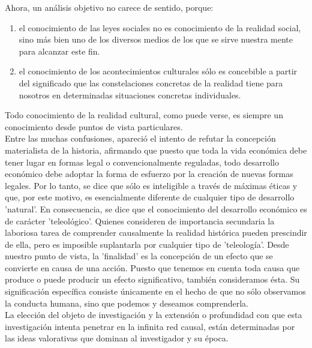 Ahora, un análisis objetivo no carece de sentido, porque:

\begin{enumerate}[1.]
    \item el conocimiento de las leyes sociales no es conocimiento de la realidad social, sino más bien uno de los diversos medios de los que se sirve nuestra mente para alcanzar este fin.
    \item el conocimiento de los acontecimientos culturales sólo es concebible a partir del significado que las constelaciones concretas de la realidad tiene para nosotros en determinadas situaciones concretas individuales.
\end{enumerate}

Todo conocimiento de la realidad cultural, como puede verse, es siempre un conocimiento desde puntos de vista particulares.\\

Entre las muchas confusiones, apareció el intento de refutar la concepción materialista de la historia, afirmando que puesto que toda la vida económica debe tener lugar en formas legal o convencionalmente reguladas, todo desarrollo económico debe adoptar la forma de esfuerzo por la creación de nuevas formas legales. Por lo tanto, se dice que sólo es inteligible a través de máximas éticas y que, por este motivo, es esencialmente diferente de cualquier tipo de desarrollo 'natural'. En consecuencia, se dice que el conocimiento del desarrollo económico es de carácter 'teleológico'.  Quienes consideren de importancia secundaria la laboriosa tarea de comprender causalmente la realidad histórica pueden prescindir de ella, pero es imposible suplantarla por cualquier tipo de 'teleología'. Desde nuestro punto de vista, la 'finalidad' es la concepción de un efecto que se convierte en causa de una acción. Puesto que tenemos en cuenta toda causa que produce o puede producir un efecto significativo, también consideramos ésta. Su significación específica consiste únicamente en el hecho de que no sólo observamos la conducta humana, sino que podemos y deseamos comprenderla.\\

La elección del objeto de investigación y la extensión o profundidad con que esta investigación intenta penetrar en la infinita red causal, están determinadas por las ideas valorativas que dominan al investigador y su época.\\

